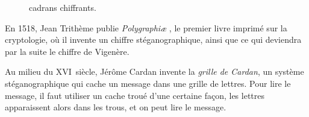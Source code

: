 \begin{figure}[h]
  \begin{center}
    \hspace{1.5cm}

  \end{center}
  \vspace{-10pt}
  \caption{cadrans chiffrants.}
  \vspace{-15pt}
\end{figure}

En 1518, Jean Trithème publie \emph{Polygraphi\ae} , le premier livre imprimé
sur la cryptologie, où il invente un chiffre stéganographique,
ainsi que ce
qui deviendra par la suite le chiffre de
Vigenère. 

Au milieu du XVI\ieme~siècle, Jérôme Cardan invente 
la \emph{grille
  de Cardan}, un système stéganographique qui cache un message dans
une grille de lettres. Pour lire le message, il faut utiliser un cache
troué d'une certaine façon, les lettres apparaissent alors dans les
trous, et on peut lire le message. \\

